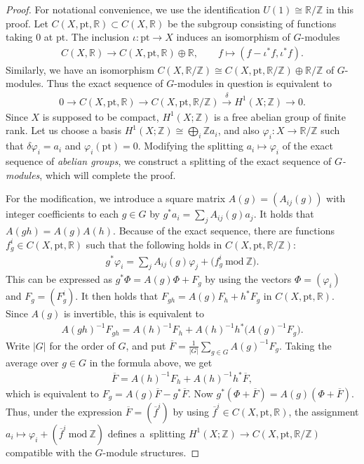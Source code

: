 \documentclass[pdftex]{sigma}
\theoremstyle{definition}
\newcommand{\R}{\mathbb{R}}
\newcommand{\Z}{\mathbb{Z}}
\newcommand{\pt}{\mathrm{pt}}
\begin{document}
\begin{proof}
For notational convenience, we use the identif\/ication $U(1) \cong \R/\Z$ in this proof. Let $C(X, \pt, \R) \subset C(X, \R)$ be the subgroup consisting of functions taking $0$ at $\pt$. The inclusion $\iota \colon \pt \to X$ induces an isomorphism of $G$-modules
\begin{gather*}
C(X, \R) \longrightarrow C(X, \pt, \R) \oplus \R, \qquad f \mapsto (f - \iota^*f, \iota^*f).
\end{gather*}
Similarly, we have an isomorphism $C(X, \R/\Z) \cong C(X, \pt, \R/\Z) \oplus \R/\Z$ of $G$-modules. Thus the exact sequence of $G$-modules in question is equivalent to
\begin{gather*}
0 \to C(X, \pt, \R) \to C(X, \pt, \R/\Z) \overset{\delta}{\to} H^1(X; \Z) \to 0.
\end{gather*}
Since $X$ is supposed to be compact, $H^1(X; \Z)$ is a free abelian group of f\/inite rank. Let us choose a basis $H^1(X; \Z) \cong \bigoplus_i \Z a_i$, and also $\varphi_i \colon X \to \R/\Z$ such that $\delta \varphi_i = a_i$ and $\varphi_i(\pt) = 0$. Modifying the splitting $a_i \mapsto \varphi_i$ of the exact sequence of \textit{abelian groups}, we construct a splitting of the exact sequence of \textit{$G$-modules}, which will complete the proof.

For the modif\/ication, we introduce a square matrix $A(g) = (A_{ij}(g))$ with integer coef\/f\/icients to each $g \in G$ by $g^*a_i = \sum_j A_{ij}(g) a_j$. It holds that $A(gh) = A(g)A(h)$. Because of the exact sequence, there are functions $f^i_g \in C(X, \pt, \R)$ such that the following holds in $C(X, \pt, \R/\Z)$:
\begin{gather*}
g^*\varphi_i = \sum_j A_{ij}(g) \varphi_j + \big(f_g^i \ \mathrm{mod} \ \Z\big).
\end{gather*}
This can be expressed as $g^*\Phi = A(g) \Phi + F_g$ by using the vectors $\Phi = (\varphi_i)$ and $F_g = (F^i_g)$. It then holds that $F_{gh} = A(g) F_h + h^*F_g$ in $C(X, \pt, \R)$. Since $A(g)$ is invertible, this is equivalent to
\begin{gather*}
A(gh)^{-1}F_{gh} = A(h)^{-1} F_h + A(h)^{-1} h^*\big(A(g)^{-1}F_g\big).
\end{gather*}
Write $\lvert G \rvert$ for the order of $G$, and put $\overline{F} = \frac{1}{\lvert G \rvert}\sum\limits_{g \in G} A(g)^{-1} F_g$. Taking the average over $g \in G$ in the formula above, we get
\begin{gather*}
\overline{F} = A(h)^{-1} F_h + A(h)^{-1} h^*\overline{F},
\end{gather*}
which is equivalent to $F_g = A(g) \overline{F} - g^*\overline{F}$. Now $g^*(\Phi + \overline{F}) = A(g) (\Phi + \overline{F})$. Thus, under the expression $\overline{F} = ( \overline{f}^i )$ by using $\overline{f}^i \in C(X, \pt, \R)$, the assignment $a_i \mapsto \varphi_i + (\overline{f}^i \ \mathrm{mod} \ \Z)$ def\/ines a~splitting $H^1(X; \Z) \to C(X, \pt, \R/\Z)$ compatible with the $G$-module structures.
\end{proof}
\end{document}
